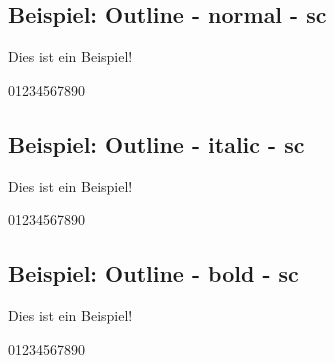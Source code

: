 \documentclass[ngerman]{libertinedoku}
\begin{document}
\subsection{Beispiel: Outline - normal - sc}

{\fontsize{2cm}{2.1cm}\selectfont
Dies ist ein Beispiel!\par 01234567890\par}

\subsection{Beispiel: Outline - italic - sc}

{\fontsize{2cm}{2.1cm}\selectfont
Dies ist ein Beispiel!\par\par 01234567890\par}

\subsection{Beispiel: Outline - bold - sc}

{\fontsize{2cm}{2.1cm}\selectfont
Dies ist ein Beispiel!\par\par 01234567890\par}
\end{document}
